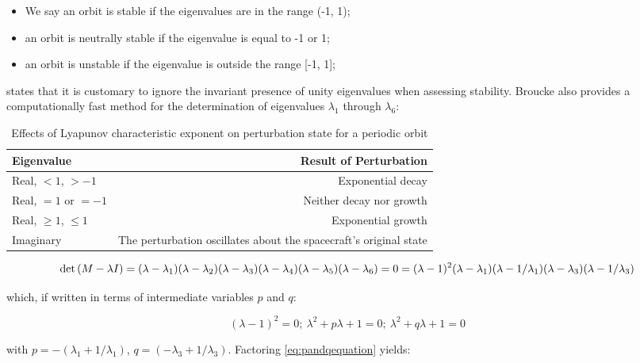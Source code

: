 \begin{itemize}
\item We say an orbit is stable if the eigenvalues are in the range (-1, 1);
\item an orbit is neutrally stable if the eigenvalue is equal to -1 or 1;
\item an orbit is unstable if the eigenvalue is outside the range [-1, 1];
\end{itemize}

\noindent \citep{broucke1968} states that it is customary to ignore the invariant presence of unity eigenvalues when assessing stability. Broucke also provides a computationally fast method for the determination of eigenvalues $\lambda_1$ through $\lambda_6$:

\begin{table}[h]\label{tbl:lyapunovexponent}
\centering
\begin{tabular}{l r}
\toprule
\toprule
\textbf{Eigenvalue} & \textbf{Result of Perturbation} \\ \toprule
Real, $< 1$, $> -1$ & Exponential decay \\
Real, $=1$ or $=-1$ & Neither decay nor growth\\
Real, $\geq 1$, $\leq 1$ & Exponential growth\\
Imaginary & The perturbation oscillates about the spacecraft's original state \\
\bottomrule
\bottomrule
\end{tabular}
\caption{Effects of Lyapunov characteristic exponent on perturbation state for a periodic orbit}
\end{table}

\begin{equation}
\textnormal{det}\left(M - \lambda I\right) = \\ (\lambda - \lambda_1)(\lambda - \lambda_2)(\lambda - \lambda_3)(\lambda - \lambda_4)(\lambda - \lambda_5)(\lambda - \lambda_6) = 0 = (\lambda - 1)^2 ( \lambda - \lambda_1)(\lambda-1/\lambda_1)(\lambda-\lambda_3)(\lambda - 1/\lambda_3)
\end{equation}

\noindent which, if written in terms of intermediate variables $p$ and $q$:

\begin{equation}\label{eq:pandqequation}
(\lambda - 1)^2 = 0;~\lambda^2 + p\lambda + 1 = 0;~\lambda^2 + q\lambda + 1 = 0
\end{equation}

\noindent with $p = -(\lambda_1 + 1/\lambda_1)$, $q = (-\lambda_3 + 1/\lambda_3)$. Factoring \ref{eq:pandqequation} yields:

